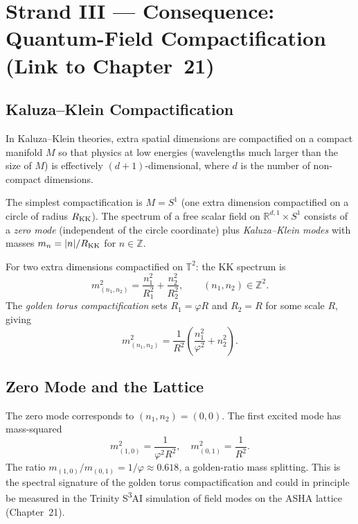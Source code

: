 \section{Strand III — Consequence: Quantum-Field
  Compactification (Link to Chapter~21)}
\label{sec:ch18-compactification}

\subsection{Kaluza--Klein Compactification}\label{subsec:ch18-kk}

In Kaluza--Klein theories, extra spatial dimensions are compactified on a
compact manifold $M$ so that physics at low energies (wavelengths much larger
than the size of $M$) is effectively $(d+1)$-dimensional, where $d$ is the
number of non-compact dimensions.

The simplest compactification is $M = S^1$ (one extra dimension compactified on
a circle of radius $R_{\rm KK}$).
The spectrum of a free scalar field on $\mathbb{R}^{d,1} \times S^1$ consists
of a \emph{zero mode} (independent of the circle coordinate) plus
\emph{Kaluza--Klein modes} with masses $m_n = |n|/R_{\rm KK}$ for $n \in \mathbb{Z}$.

For two extra dimensions compactified on $\mathbb{T}^2$:
the KK spectrum is
\begin{equation}\label{eq:kk-spectrum}
  m_{(n_1,n_2)}^2 = \frac{n_1^2}{R_1^2} + \frac{n_2^2}{R_2^2},
  \qquad (n_1,n_2) \in \mathbb{Z}^2.
\end{equation}
The \emph{golden torus compactification} sets $R_1 = \varphi R$ and $R_2 = R$
for some scale $R$, giving
\begin{equation}\label{eq:kk-golden}
  m_{(n_1,n_2)}^2 = \frac{1}{R^2}\left(\frac{n_1^2}{\varphi^2} + n_2^2\right).
\end{equation}

\subsection{Zero Mode and the Lattice}\label{subsec:ch18-zero-mode}

The zero mode corresponds to $(n_1,n_2) = (0,0)$.
The first excited mode has mass-squared
\begin{equation}
  m_{(1,0)}^2 = \frac{1}{\varphi^2 R^2}, \quad
  m_{(0,1)}^2 = \frac{1}{R^2}.
\end{equation}
The ratio $m_{(1,0)}/m_{(0,1)} = 1/\varphi \approx 0.618$, a golden-ratio mass
splitting.
This is the spectral signature of the golden torus compactification and could in
principle be measured in the Trinity S\textsuperscript{3}AI simulation of field
modes on the ASHA lattice (Chapter~21).

